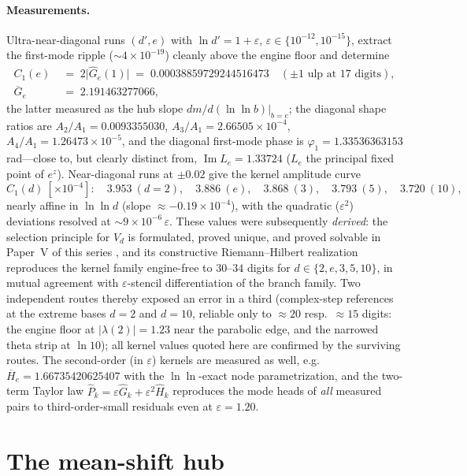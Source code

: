 \documentclass[11pt,a4paper]{article}
\theoremstyle{definition}
\theoremstyle{remark}
\begin{document}
\paragraph{Measurements.}
Ultra-near-diagonal runs $(d',e)$ with $\ln d'=1+\varepsilon$,
$\varepsilon\in\{10^{-12},10^{-15}\}$, extract the first-mode ripple ($\sim4\times10^{-19}$)
cleanly above the engine floor and determine
\begin{align*}
C_1(e)&\;=\;2\lvert\widehat G_e(1)\rvert\;=\;0.00038859729244516473\quad(\pm\text{1 ulp at
17 digits}),\\
\overline G_e&\;=\;2.191463277066,
\end{align*}
the latter measured as the hub slope $dm/d(\ln\ln b)\vert_{b=e}$; the diagonal shape ratios
are $A_2/A_1=0.0093355030$, $A_3/A_1=2.66505\times10^{-4}$, $A_4/A_1=1.26473\times10^{-5}$,
and the diagonal first-mode phase is $\varphi_1=1.33536363153$ rad---close to, but clearly
distinct from, $\operatorname{Im}L_e=1.33724$ ($L_e$ the principal fixed point of
$e^z$). Near-diagonal runs at $\pm0.02$ give the kernel amplitude curve
\[
C_1(d)\ [\times10^{-4}]:\quad 3.953\ (d{=}2),\quad 3.886\ (e),\quad 3.868\ (3),\quad
3.793\ (5),\quad 3.720\ (10),
\]
nearly affine in $\ln\ln d$ (slope $\approx-0.19\times10^{-4}$), with the quadratic
($\varepsilon^2$) deviations resolved at $\sim9\times10^{-6}\,\varepsilon$. These values were subsequently \emph{derived}: the selection principle for
$V_d$ is formulated, proved unique, and proved solvable in Paper~V of this series
\cite{paperV}, and its constructive Riemann--Hilbert realization reproduces the kernel
family engine-free to $30$--$34$ digits for $d\in\{2,e,3,5,10\}$, in mutual agreement with
$\varepsilon$-stencil differentiation of the branch family. Two independent routes thereby
exposed an error in a third (complex-step references at the extreme bases $d=2$ and $d=10$,
reliable only to $\approx20$ resp.\ $\approx15$ digits: the engine floor at
$\lvert\lambda(2)\rvert=1.23$ near the parabolic edge, and the narrowed theta strip at
$\ln 10$); all kernel values quoted here are confirmed by the surviving routes. The
second-order (in $\varepsilon$) kernels are measured as well, e.g.\
$\overline H_e=1.66735420625407$ with the $\ln\ln$-exact node parametrization, and the
two-term Taylor law $\widehat P_k=\varepsilon\widehat G_k+\varepsilon^2\widehat H_k$
reproduces the mode heads of \emph{all} measured pairs to third-order-small residuals even
at $\varepsilon=1.20$.

\section{The mean-shift hub}\label{sec:hub}
\end{document}
